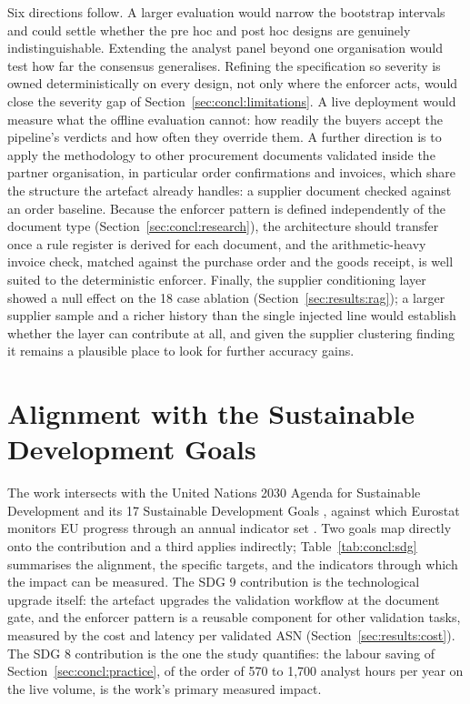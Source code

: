 Six directions follow. A larger evaluation would narrow the bootstrap intervals and could settle whether the pre hoc and post hoc designs are genuinely indistinguishable. Extending the analyst panel beyond one organisation would test how far the consensus generalises. Refining the specification so severity is owned deterministically on every design, not only where the enforcer acts, would close the severity gap of Section~\ref{sec:concl:limitations}. A live deployment would measure what the offline evaluation cannot: how readily the buyers accept the pipeline's verdicts and how often they override them. A further direction is to apply the methodology to other procurement documents validated inside the partner organisation, in particular order confirmations and invoices, which share the structure the artefact already handles: a supplier document checked against an order baseline. Because the enforcer pattern is defined independently of the document type (Section~\ref{sec:concl:research}), the architecture should transfer once a rule register is derived for each document, and the arithmetic-heavy invoice check, matched against the purchase order and the goods receipt, is well suited to the deterministic enforcer. Finally, the supplier conditioning layer showed a null effect on the 18 case ablation (Section~\ref{sec:results:rag}); a larger supplier sample and a richer history than the single injected line would establish whether the layer can contribute at all, and given the supplier clustering finding it remains a plausible place to look for further accuracy gains.

\section{Alignment with the Sustainable Development Goals}
\label{sec:concl:sdg}

The work intersects with the United Nations 2030 Agenda for Sustainable Development and its 17 Sustainable Development Goals \citep{un2030agenda}, against which Eurostat monitors EU progress through an annual indicator set \citep{eurostat2025}. Two goals map directly onto the contribution and a third applies indirectly; Table~\ref{tab:concl:sdg} summarises the alignment, the specific targets, and the indicators through which the impact can be measured. The SDG 9 contribution is the technological upgrade itself: the artefact upgrades the validation workflow at the document gate, and the enforcer pattern is a reusable component for other validation tasks, measured by the cost and latency per validated ASN (Section~\ref{sec:results:cost}). The SDG 8 contribution is the one the study quantifies: the labour saving of Section~\ref{sec:concl:practice}, of the order of 570 to 1,700 analyst hours per year on the live volume, is the work's primary measured impact.

